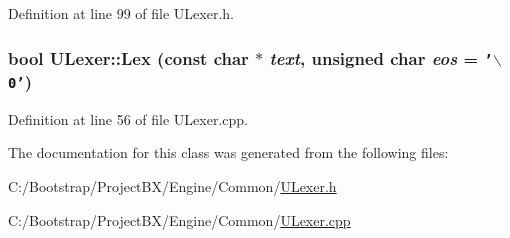 Definition at line 99 of file ULexer.h.\hypertarget{class_u_lexer_f083d8bf0bffa896c603117dddf34017}{
\subsubsection[{Lex}]{\setlength{\rightskip}{0pt plus 5cm}bool ULexer::Lex (const char $\ast$ {\em text}, \/  unsigned char {\em eos} = {\tt '$\backslash$0'})}}
\label{class_u_lexer_f083d8bf0bffa896c603117dddf34017}




Definition at line 56 of file ULexer.cpp.

The documentation for this class was generated from the following files:\begin{CompactItemize}
\item 
C:/Bootstrap/ProjectBX/Engine/Common/\hyperlink{_u_lexer_8h}{ULexer.h}\item 
C:/Bootstrap/ProjectBX/Engine/Common/\hyperlink{_u_lexer_8cpp}{ULexer.cpp}\end{CompactItemize}
